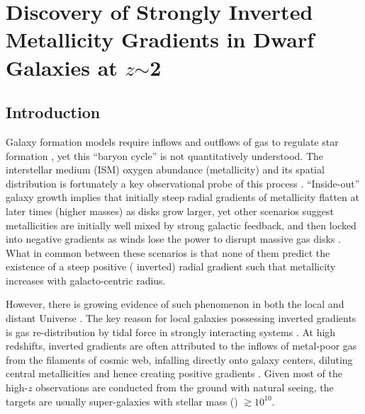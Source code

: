 
\chapter{Discovery of Strongly Inverted Metallicity Gradients in Dwarf Galaxies at $z$$\sim$2}

\section{Introduction}\label{sect:intro}

Galaxy formation models require inflows and outflows of gas to regulate star formation 
\citep{2008MNRAS.385.2181F,Recchi:2008gw,Bouche:2010kh,2012MNRAS.421...98D,Dayal:2013im,Dekel:2013id,Lilly:2013ko,Dekel:2014jm,Peng:2014hn,Pipino:2014it}, 
yet this ``baryon cycle'' is not quantitatively understood. The interstellar medium (ISM) oxygen abundance 
(\ie metallicity) and its 
spatial distribution
is fortunately a key observational probe of this process
\citep{Tremonti:2004ed,Erb:2006kn,2008A&A...488..463M,Bresolin:2009hh,2010MNRAS.408.2115M,Mannucci:2011be,Zahid:2011bb,Yates:2012kx,Zahid:2012cd,
Henry:2013cn,2013ApJ...765...48J,2014A&A...563A..49S,TheUniversalRelati:2014kx,Bresolin:2015fk,Ho:2015gq,Sanders:2015gk,Strom:2016vn}.
``Inside-out'' galaxy growth implies that initially steep radial gradients of metallicity flatten at later 
times (higher masses)
as disks grow larger, yet other scenarios suggest metallicities are initially well mixed by strong galactic feedback, and then
locked into negative gradients as winds lose the power to disrupt massive gas disks
\citep{Prantzos:2000gb,Hou:2000tq,Molla:2005eq,Kobayashi:2011cr,Few:2012jl,Pilkington:2012ib,Gibson:2013jw,2017MNRAS.466.4780M}.
What in common between these scenarios is that none of them predict the existence of a steep positive (\ie 
inverted) radial gradient such that metallicity increases with galacto-centric radius.

However, there is growing evidence of such phenomenon in both the local and distant Universe
\citep{Cresci:2010hr,Queyrel:2012hw,2014MNRAS.443.2695S,Metallicityevolutio:2014kg,2014A&A...563A..49S,PerezMontero:2016hs,2016ApJ...827...74W,Belfiore:2017bv,Carton:2018kv}.
The key reason for local galaxies possessing inverted gradients is gas re-distribution by tidal force in strongly interacting
systems \citep{Kewley:2006gb,Kewley:2010eg,Rupke:2010cg,AnIntegralFieldSt:2012hn,Torrey:2012kf}.
At high redshifts, inverted gradients are often attributed to the inflows of metal-poor gas from the filaments of cosmic web,
infalling directly onto galaxy centers, diluting central metallicities and hence creating positive gradients
\citep{Cresci:2010hr,Mott:2013bt}.
Given most of the high-$z$ observations are conducted from the ground with natural seeing, the targets are usually
super-\Lstar galaxies with stellar mass (\Mstar) $\gtrsim$$10^{10}$\Msun \citep[see \eg,][]{Metallicityevolutio:2014kg}.

